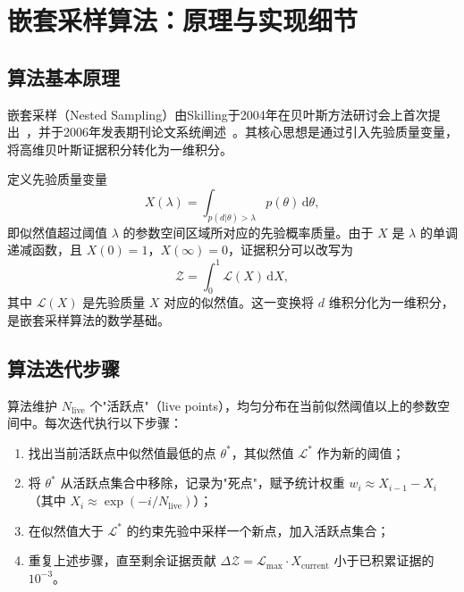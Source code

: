\pagestyle{mystyle}

\appendix

\chapter{嵌套采样算法：原理与实现细节}
\label{app:nested_sampling}

\section{算法基本原理}

嵌套采样（Nested Sampling）由Skilling于2004年在贝叶斯方法研讨会上首次提出~\cite{Skilling2004nested}，并于2006年发表期刊论文系统阐述~\cite{Skilling2006nested}。其核心思想是通过引入先验质量变量，将高维贝叶斯证据积分转化为一维积分。

定义先验质量变量
\begin{equation}
  X(\lambda) = \int_{p(d|\theta) > \lambda} p(\theta)\,\mathrm{d}\theta,
\end{equation}
即似然值超过阈值 $\lambda$ 的参数空间区域所对应的先验概率质量。由于 $X$ 是 $\lambda$ 的单调递减函数，且 $X(0)=1$，$X(\infty)=0$，证据积分可以改写为
\begin{equation}
  \mathcal{Z} = \int_0^1 \mathcal{L}(X)\,\mathrm{d}X,
\end{equation}
其中 $\mathcal{L}(X)$ 是先验质量 $X$ 对应的似然值。这一变换将 $d$ 维积分化为一维积分，是嵌套采样算法的数学基础。

\section{算法迭代步骤}

算法维护 $N_\mathrm{live}$ 个"活跃点"（live points），均匀分布在当前似然阈值以上的参数空间中。每次迭代执行以下步骤：

\begin{enumerate}
  \item 找出当前活跃点中似然值最低的点 $\theta^*$，其似然值 $\mathcal{L}^*$ 作为新的阈值；
  \item 将 $\theta^*$ 从活跃点集合中移除，记录为"死点"，赋予统计权重 $w_i \approx X_{i-1} - X_i$（其中 $X_i \approx \exp(-i/N_\mathrm{live})$）；
  \item 在似然值大于 $\mathcal{L}^*$ 的约束先验中采样一个新点，加入活跃点集合；
  \item 重复上述步骤，直至剩余证据贡献 $\Delta\mathcal{Z} = \mathcal{L}_\mathrm{max} \cdot X_\mathrm{current}$ 小于已积累证据的 $10^{-3}$。
\end{enumerate}

